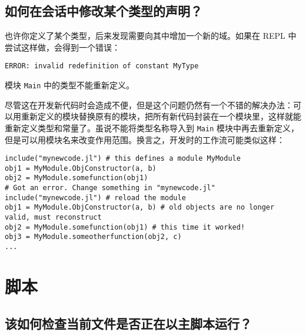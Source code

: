 \hypertarget{191104846954255908}{}


\subsection{如何在会话中修改某个类型的声明？}



也许你定义了某个类型，后来发现需要向其中增加一个新的域。如果在 REPL 中尝试这样做，会得到一个错误：




\begin{lstlisting}
ERROR: invalid redefinition of constant MyType
\end{lstlisting}



模块 \texttt{Main} 中的类型不能重新定义。



尽管这在开发新代码时会造成不便，但是这个问题仍然有一个不错的解决办法：可以用重新定义的模块替换原有的模块，把所有新代码封装在一个模块里，这样就能重新定义类型和常量了。虽说不能将类型名称导入到 \texttt{Main} 模块中再去重新定义，但是可以用模块名来改变作用范围。换言之，开发时的工作流可能类似这样：




\begin{verbatim}
include("mynewcode.jl") # this defines a module MyModule
obj1 = MyModule.ObjConstructor(a, b)
obj2 = MyModule.somefunction(obj1)
# Got an error. Change something in "mynewcode.jl"
include("mynewcode.jl") # reload the module
obj1 = MyModule.ObjConstructor(a, b) # old objects are no longer valid, must reconstruct
obj2 = MyModule.somefunction(obj1) # this time it worked!
obj3 = MyModule.someotherfunction(obj2, c)
...
\end{verbatim}



\hypertarget{11224408082580741592}{}


\section{脚本}



\hypertarget{14939284717840791757}{}


\subsection{该如何检查当前文件是否正在以主脚本运行？}



